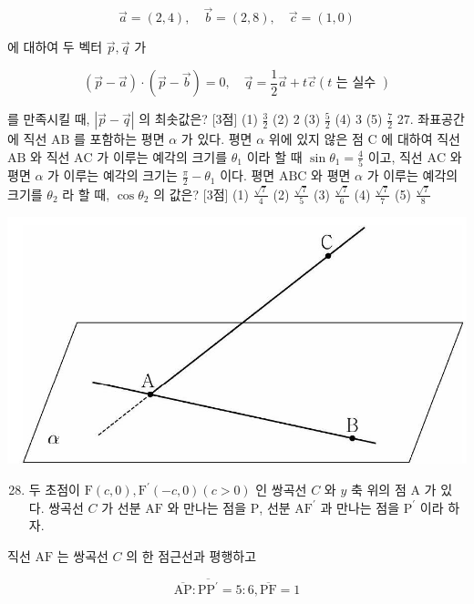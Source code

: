 \documentclass[10pt]{article}
\begin{document}
$$
\vec{a}=(2,4), \quad \vec{b}=(2,8), \quad \vec{c}=(1,0)
$$

에 대하여 두 벡터 $\vec{p}, \vec{q}$ 가

$$
(\vec{p}-\vec{a}) \cdot(\vec{p}-\vec{b})=0, \quad \vec{q}=\frac{1}{2} \vec{a}+t \vec{c}(t \text { 는 실수 })
$$

를 만족시킬 때, $|\vec{p}-\vec{q}|$ 의 최솟값은? [3점]
(1) $\frac{3}{2}$
(2) 2
(3) $\frac{5}{2}$
(4) 3
(5) $\frac{7}{2}$ 27. 좌표공간에 직선 $\mathrm{AB}$ 를 포함하는 평면 $\alpha$ 가 있다. 평면 $\alpha$ 위에 있지 않은 점 $\mathrm{C}$ 에 대하여 직선 $\mathrm{AB}$ 와 직선 $\mathrm{AC}$ 가 이루는 예각의 크기를 $\theta_{1}$ 이라 할 때 $\sin \theta_{1}=\frac{4}{5}$ 이고, 직선 $\mathrm{AC}$ 와 평면 $\alpha$ 가 이루는 예각의 크기는 $\frac{\pi}{2}-\theta_{1}$ 이다. 평면 $\mathrm{ABC}$ 와 평면 $\alpha$ 가 이루는 예각의 크기를 $\theta_{2}$ 라 할 때, $\cos \theta_{2}$ 의 값은? [3점]
(1) $\frac{\sqrt{7}}{4}$
(2) $\frac{\sqrt{7}}{5}$
(3) $\frac{\sqrt{7}}{6}$
(4) $\frac{\sqrt{7}}{7}$
(5) $\frac{\sqrt{7}}{8}$

\begin{center}
\includegraphics[max width=\textwidth]{2023_06_06_b380aa8523ec7afae994g-39(1)}
\end{center}

\begin{enumerate}
  \setcounter{enumi}{27}
  \item 두 초점이 $\mathrm{F}(c, 0), \mathrm{F}^{\prime}(-c, 0)(c>0)$ 인 쌍곡선 $C$ 와 $y$ 축 위의 점 $\mathrm{A}$ 가 있다. 쌍곡선 $C$ 가 선분 $\mathrm{AF}$ 와 만나는 점을 $\mathrm{P}$, 선분 $\mathrm{AF}^{\prime}$ 과 만나는 점을 $\mathrm{P}^{\prime}$ 이라 하자.
\end{enumerate}

직선 $\mathrm{AF}$ 는 쌍곡선 $C$ 의 한 점근선과 평행하고

$$
\overline{\mathrm{AP}}: \overline{\mathrm{PP}^{\prime}}=5: 6, \overline{\mathrm{PF}}=1
$$
\end{document}
